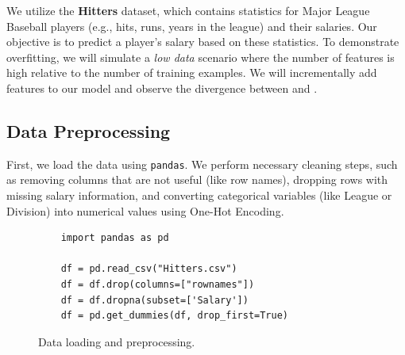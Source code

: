 We utilize the \textbf{Hitters} dataset, which contains statistics for Major League Baseball players (e.g.,
hits, runs, years in the league) and their salaries. Our objective is to predict a player's salary based on
these statistics.  To demonstrate overfitting, we will simulate a \emph{low data} scenario where the number of
features is high relative to the number of training examples. We will incrementally add features to our model
and observe the divergence between  and . 

\subsection{Data Preprocessing}
First, we load the data using \texttt{pandas}. We perform necessary cleaning steps, such as removing columns that are not useful (like row names), dropping rows with missing salary information, and converting categorical variables (like League or Division) into numerical values using One-Hot Encoding.

\begin{figure}[!ht]
  \centering
  \begin{verbatim}
    import pandas as pd
    
    df = pd.read_csv("Hitters.csv")
    df = df.drop(columns=["rownames"])
    df = df.dropna(subset=['Salary'])
    df = pd.get_dummies(df, drop_first=True)
\end{verbatim}
\caption{Data loading and preprocessing.}
\label{fig:preprocessing-hitters}
\end{figure}

